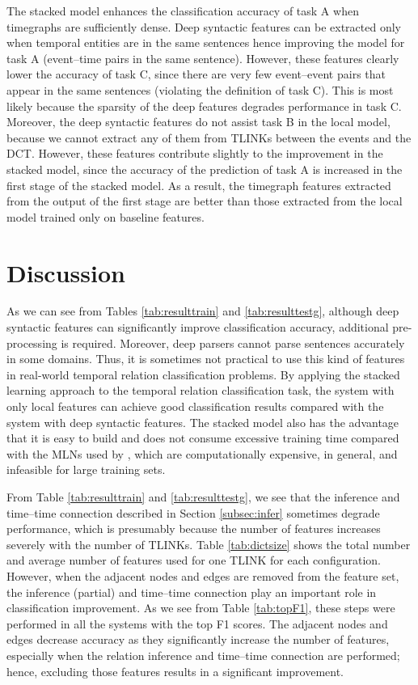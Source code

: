 \documentclass[english]{jnlp_1.4}
\begin{document}
The stacked model enhances the classification accuracy of task A when timegraphs are sufficiently dense.
Deep syntactic features can be extracted only when temporal entities are in the same sentences hence improving the model for task A (event--time pairs in the same sentence).
However, these features clearly lower the accuracy of task C, since there are very few event--event pairs that appear in the same sentences (violating the definition of task C).
This is most likely because the sparsity of the deep features degrades performance in task C.
Moreover, the deep syntactic features do not assist task B in the local model, because we cannot extract any of them from TLINKs between the events and the DCT.
However, these features contribute slightly to the improvement in the stacked model, since the accuracy of the prediction of task A is increased in the first stage of the stacked model.
As a result, the timegraph features extracted from the output of the first stage are better than those extracted from the local model trained only on baseline features.


\section{Discussion}
\label{sec:discussion}

As we can see from Tables \ref{tab:resulttrain} and \ref{tab:resulttestg}, although deep syntactic features can significantly improve classification accuracy, additional pre-processing is required.
Moreover, deep parsers cannot parse sentences accurately in some domains.
Thus, it is sometimes not practical to use this kind of features in real-world temporal relation classification problems.
By applying the stacked learning approach to the temporal relation classification task, the system with only local features can achieve good classification results compared with the system with deep syntactic features.
The stacked model also has the advantage that it is easy to build and does not consume excessive training time compared with the MLNs used by , which are computationally expensive, in general, and infeasible for large training sets.

From Table \ref{tab:resulttrain} and \ref{tab:resulttestg}, we see that the inference and time--time connection described in Section \ref{subsec:infer} sometimes degrade performance, which is presumably because the number of features increases severely with the number of TLINKs.
Table \ref{tab:dictsize} shows the total number and average number of features used for one TLINK for each configuration.
However, when the adjacent nodes and edges are removed from the feature set, the inference (partial) and time--time connection play an important role in classification improvement.
As we see from Table \ref{tab:topF1}, these steps were performed in all the systems with the top F1 scores.
The adjacent nodes and edges decrease accuracy as they significantly increase the number of features, especially when the relation inference and time--time connection are performed; hence, excluding those features results in a significant improvement.
\end{document}
